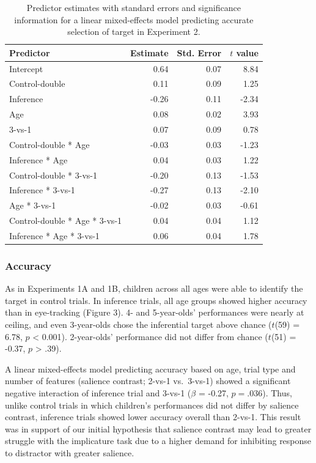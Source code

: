 \documentclass[a4paper,man,apacite,floatsintext]{apa6}
\begin{document}
\begin{table}[tb]
\centering
\begin{tabular}{lrrr}
 Predictor & Estimate & Std. Error & $t$ value \\ 
  \hline
Intercept & 0.64 & 0.07 & 8.84 \\ 
  Control-double & 0.11 & 0.09 & 1.25 \\ 
  Inference & -0.26 & 0.11 & -2.34 \\ 
  Age & 0.08 & 0.02 & 3.93 \\ 
  3-vs-1 & 0.07 & 0.09 & 0.78 \\ 
  Control-double * Age & -0.03 & 0.03 & -1.23 \\ 
  Inference * Age & 0.04 & 0.03 & 1.22 \\ 
  Control-double * 3-vs-1 & -0.20 & 0.13 & -1.53 \\ 
  Inference * 3-vs-1 & -0.27 & 0.13 & -2.10 \\ 
  Age * 3-vs-1 & -0.02 & 0.03 & -0.61 \\ 
  Control-double * Age * 3-vs-1 & 0.04 & 0.04 & 1.12 \\ 
  Inference * Age * 3-vs-1 & 0.06 & 0.04 & 1.78 \\ 
   \hline
\end{tabular}
\caption{Predictor estimates with standard errors and significance information for a linear mixed-effects model predicting accurate selection of target in Experiment 2.} 
\label{tab:exp3_tab}
\end{table}

\subsubsection{Accuracy}\label{accuracy-2}

As in Experiments 1A and 1B, children across all ages were able to
identify the target in control trials. In inference trials, all age
groups showed higher accuracy than in eye-tracking (Figure 3). 4- and
5-year-olds' performances were nearly at ceiling, and even 3-year-olds
chose the inferential target above chance (\(t\)(59) = 6.78, \(p\)
\textless{} 0.001). 2-year-olds' performance did not differ from chance
(\(t\)(51) = -0.37, \(p\) \textgreater{} .39).

A linear mixed-effects model predicting accuracy based on age, trial
type and number of features (salience contrast; 2-vs-1 vs.~3-vs-1)
showed a significant negative interaction of inference trial and 3-vs-1
(\(\beta\) = -0.27, \(p = .036\)). Thus, unlike control trials in which
children's performances did not differ by salience contrast, inference
trials showed lower accuracy overall than 2-vs-1. This result was in
support of our initial hypothesis that salience contrast may lead to
greater struggle with the implicature task due to a higher demand for
inhibiting response to distractor with greater salience.
\end{document}
